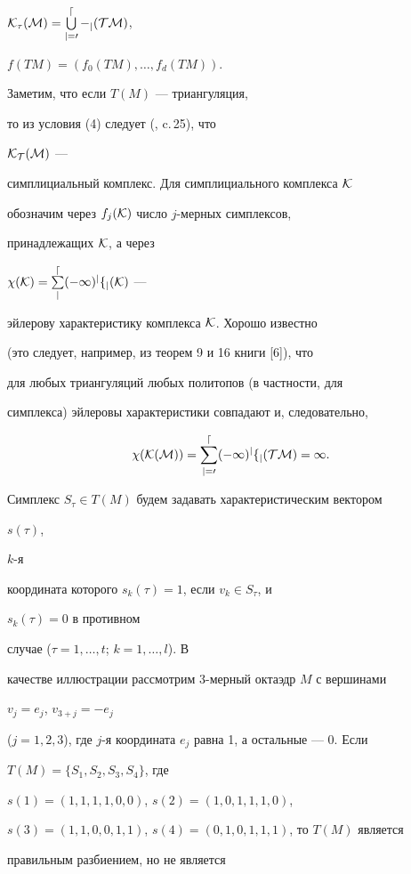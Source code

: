 $\cal K_\tau(M)=\bigcup\limits^d_{j=0}\Gamma_j(TM)$,


$f(TM)=(f_0(TM),\dotsc,f_d(TM))$.


Заметим, что если $T(M)$ --- триангуляция,


то из условия (4) следует (\cite{Pon}, c.\,25), что


$\cal K_T(M)$ ---


симплициальный комплекс. Для симплициального комплекса $\cal K$


обозначим через $f_j(\cal K)$ число $j$-мерных симплексов,


принадлежащих $\cal K$, а через


$\chi(\cal K)=\sum\limits^d_j(-1)^j f_j(\cal K)$ ---


эйлерову характеристику комплекса $\cal K$. Хорошо известно


(это следует, например, из теорем 9 и 16 книги [6]), что


для любых триангуляций любых политопов (в частности, для


симплекса) эйлеровы характеристики совпадают и, следовательно,


\begin{equation}


\chi(\cal K(M))=\sum^d_{j=0}(-1)^j f_j(TM)=1.


\end{equation}





Симплекс $S_\tau\in T(M)$ будем задавать характеристическим вектором


$s(\tau)$,


$k$-я


координата которого $s_k(\tau)=1$, если $v_k\in S_\tau$, и


$s_k(\tau)=0$ в противном


случае ($\tau=1,\dotsc,t$; $k=1,\dotsc,l$). В


качестве иллюстрации рассмотрим 3-мерный октаэдр $M$ с вершинами


$v_j=e_j$, $v_{3+j}=-e_j$


($j=1,2,3$), где $j$-я координата $e_j$ равна 1, а остальные --- 0. Если


$T(M)=\{S_1,S_2,S_3,S_4\}$, где


$s(1)=(1,1,1,1,0,0)$, $s(2)=(1,0,1,1,1,0)$,


$s(3)=(1,1,0,0,1,1)$, $s(4)=(0,1,0,1,1,1)$, то $T(M)$ является


правильным разбиением, но не является


